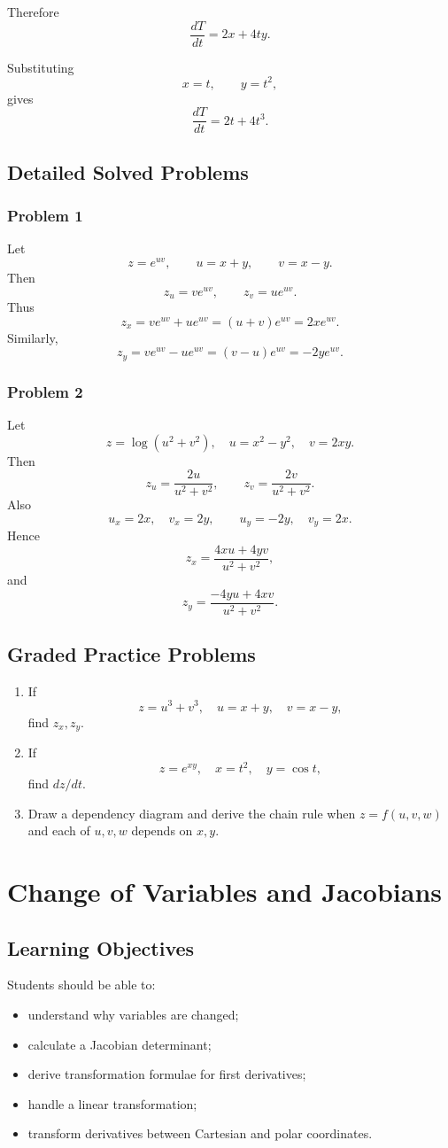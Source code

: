 \documentclass[11pt,oneside]{book}
\theoremstyle{studentthm}
\theoremstyle{definition}
\begin{document}
Therefore
\[
\frac{dT}{dt}
=
2x+4ty.
\]

Substituting
\[
x=t,\qquad y=t^2,
\]
gives
\[
\frac{dT}{dt}
=
2t+4t^3.
\]


\section{Detailed Solved Problems}

\subsection*{Problem 1}
Let
\[
z=e^{uv},
\qquad
u=x+y,
\qquad
v=x-y.
\]
Then
\[
z_u=ve^{uv},
\qquad
z_v=ue^{uv}.
\]
Thus
\[
z_x
=
ve^{uv}+ue^{uv}
=
(u+v)e^{uv}
=
2xe^{uv}.
\]
Similarly,
\[
z_y
=
ve^{uv}-ue^{uv}
=
(v-u)e^{uv}
=
-2ye^{uv}.
\]

\subsection*{Problem 2}
Let
\[
z=\log(u^2+v^2),
\quad
u=x^2-y^2,
\quad
v=2xy.
\]
Then
\[
z_u=\frac{2u}{u^2+v^2},
\qquad
z_v=\frac{2v}{u^2+v^2}.
\]
Also
\[
u_x=2x,\quad v_x=2y,
\qquad
u_y=-2y,\quad v_y=2x.
\]
Hence
\[
z_x
=
\frac{4xu+4yv}{u^2+v^2},
\]
and
\[
z_y
=
\frac{-4yu+4xv}{u^2+v^2}.
\]

\section{Graded Practice Problems}
\begin{enumerate}
\item If
\[
z=u^3+v^3,\quad u=x+y,\quad v=x-y,
\]
find \(z_x,z_y\).
\item If
\[
z=e^{xy},\quad x=t^2,\quad y=\cos t,
\]
find \(dz/dt\).
\item Draw a dependency diagram and derive the chain rule when
\(z=f(u,v,w)\) and each of \(u,v,w\) depends on \(x,y\).
\end{enumerate}

\chapter{Change of Variables and Jacobians}

\section*{Learning Objectives}
Students should be able to:
\begin{itemize}
\item understand why variables are changed;
\item calculate a Jacobian determinant;
\item derive transformation formulae for first derivatives;
\item handle a linear transformation;
\item transform derivatives between Cartesian and polar coordinates.
\end{itemize}
\end{document}
